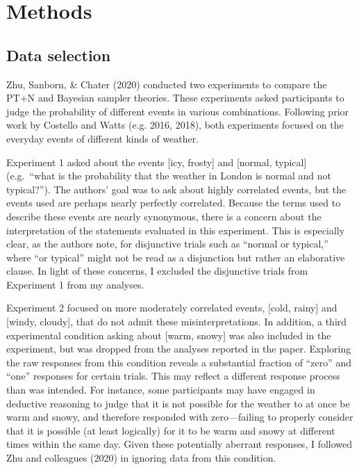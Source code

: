 \documentclass[
  english,
  man,floatsintext]{apa6}
\begin{document}
\hypertarget{methods}{%
\section{Methods}\label{methods}}

\hypertarget{data-selection}{%
\subsection{Data selection}\label{data-selection}}

Zhu, Sanborn, \& Chater (2020) conducted two experiments to compare the PT+N and Bayesian sampler theories. These experiments asked participants to judge the probability of different events in various combinations. Following prior work by Costello and Watts (e.g. 2016, 2018), both experiments focused on the everyday events of different kinds of weather.

Experiment 1 asked about the events {[}icy, frosty{]} and {[}normal, typical{]} (e.g.~``what is the probability that the weather in London is normal and not typical?''). The authors' goal was to ask about highly correlated events, but the events used are perhaps nearly perfectly correlated. Because the terms used to describe these events are nearly synonymous, there is a concern about the interpretation of the statements evaluated in this experiment. This is especially clear, as the authors note, for disjunctive trials such as ``normal or typical,'' where ``or typical'' might not be read as a disjunction but rather an elaborative clause. In light of these concerns, I excluded the disjunctive trials from Experiment 1 from my analyses.

Experiment 2 focused on more moderately correlated events, {[}cold, rainy{]} and {[}windy, cloudy{]}, that do not admit these misinterpretations. In addition, a third experimental condition asking about {[}warm, snowy{]} was also included in the experiment, but was dropped from the analyses reported in the paper. Exploring the raw responses from this condition reveals a substantial fraction of ``zero'' and ``one'' responses for certain trials. This may reflect a different response process than was intended. For instance, some participants may have engaged in deductive reasoning to judge that it is not possible for the weather to at once be warm and snowy, and therefore responded with zero---failing to properly consider that it is possible (at least logically) for it to be warm and snowy at different times within the same day. Given these potentially aberrant responses, I followed Zhu and colleagues (2020) in ignoring data from this condition.
\end{document}
